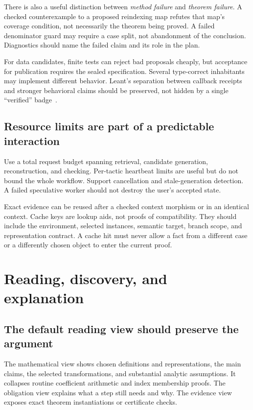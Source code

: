 \documentclass[11pt,a4paper]{article}
\theoremstyle{definition}
\theoremstyle{remark}
\begin{document}
There is also a useful distinction between \emph{method failure} and \emph{theorem failure}. A checked counterexample to a proposed reindexing map refutes that map's coverage condition, not necessarily the theorem being proved. A failed denominator guard may require a case split, not abandonment of the conclusion. Diagnostics should name the failed claim and its role in the plan.

For data candidates, finite tests can reject bad proposals cheaply, but acceptance for publication requires the sealed specification. Several type-correct inhabitants may implement different behavior. Leant's separation between callback receipts and stronger behavioral claims should be preserved, not hidden by a single ``verified'' badge~\cite{verification}.

\subsection{Resource limits are part of a predictable interaction}
Use a total request budget spanning retrieval, candidate generation, reconstruction, and checking. Per-tactic heartbeat limits are useful but do not bound the whole workflow. Support cancellation and stale-generation detection. A failed speculative worker should not destroy the user's accepted state.

Exact evidence can be reused after a checked context morphism or in an identical context. Cache keys are lookup aids, not proofs of compatibility. They should include the environment, selected instances, semantic target, branch scope, and representation contract. A cache hit must never allow a fact from a different case or a differently chosen object to enter the current proof.

\section{Reading, discovery, and explanation}\label{sec:ui}
\subsection{The default reading view should preserve the argument}
The mathematical view shows chosen definitions and representations, the main claims, the selected transformations, and substantial analytic assumptions. It collapses routine coefficient arithmetic and index membership proofs. The obligation view explains what a step still needs and why. The evidence view exposes exact theorem instantiations or certificate checks.
\end{document}
